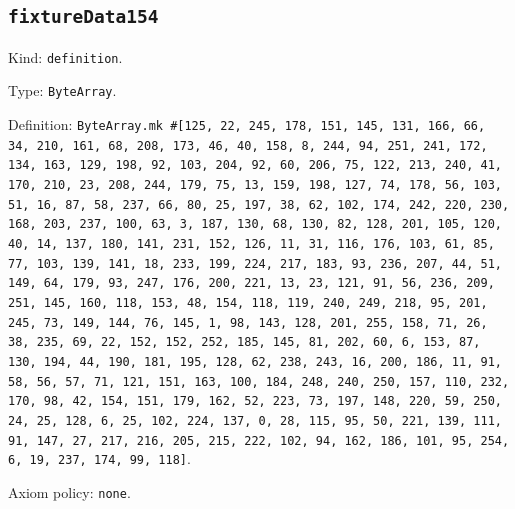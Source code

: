 \documentclass[11pt]{article}
\begin{document}
\subsection*{\texttt{fixtureData154}}
\noindent Kind: \texttt{definition}.\par
\noindent Type: \texttt{ByteArray}.\par
\noindent Definition: \texttt{ByteArray.mk \#[125, 22, 245, 178, 151, 145, 131, 166, 66, 34, 210, 161, 68, 208, 173, 46, 40, 158, 8, 244, 94, 251, 241, 172, 134, 163, 129, 198, 92, 103, 204, 92, 60, 206, 75, 122, 213, 240, 41, 170, 210, 23, 208, 244, 179, 75, 13, 159, 198, 127, 74, 178, 56, 103, 51, 16, 87, 58, 237, 66, 80, 25, 197, 38, 62, 102, 174, 242, 220, 230, 168, 203, 237, 100, 63, 3, 187, 130, 68, 130, 82, 128, 201, 105, 120, 40, 14, 137, 180, 141, 231, 152, 126, 11, 31, 116, 176, 103, 61, 85, 77, 103, 139, 141, 18, 233, 199, 224, 217, 183, 93, 236, 207, 44, 51, 149, 64, 179, 93, 247, 176, 200, 221, 13, 23, 121, 91, 56, 236, 209, 251, 145, 160, 118, 153, 48, 154, 118, 119, 240, 249, 218, 95, 201, 245, 73, 149, 144, 76, 145, 1, 98, 143, 128, 201, 255, 158, 71, 26, 38, 235, 69, 22, 152, 152, 252, 185, 145, 81, 202, 60, 6, 153, 87, 130, 194, 44, 190, 181, 195, 128, 62, 238, 243, 16, 200, 186, 11, 91, 58, 56, 57, 71, 121, 151, 163, 100, 184, 248, 240, 250, 157, 110, 232, 170, 98, 42, 154, 151, 179, 162, 52, 223, 73, 197, 148, 220, 59, 250, 24, 25, 128, 6, 25, 102, 224, 137, 0, 28, 115, 95, 50, 221, 139, 111, 91, 147, 27, 217, 216, 205, 215, 222, 102, 94, 162, 186, 101, 95, 254, 6, 19, 237, 174, 99, 118]}.\par
\noindent Axiom policy: \texttt{none}.\par
\end{document}
